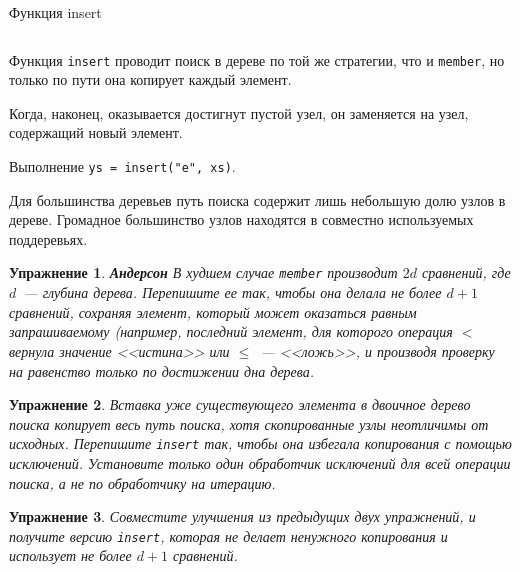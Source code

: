\documentclass[aspectratio=169
  , xcolor={svgnames}
  , hyperref={ colorlinks,citecolor=DeepPink4
             , linkcolor=DarkRed,urlcolor=DarkBlue}
  , russian
  ]{beamer}
\theoremstyle{exerciseStyle1}
\newtheorem{exercise}{\textbf{Упражнение}}[section]
\renewcommand{\cite}[1]{}
\begin{document}
\begin{frame}[fragile]{Функция insert}
\inputminted[firstline=27, lastline=30] {haskell}{code/SearchTree.hs}

Функция \lstinline{insert} проводит поиск в дереве по той же стратегии,
что и \lstinline{member}, но только по пути она копирует каждый
элемент.

Когда, наконец, оказывается достигнут пустой узел, он
заменяется на узел, содержащий новый элемент.
 
\end{frame}

\begin{frame}[fragile]{}
\begin{minipage}{.48\textwidth}
		\par
\end{minipage}
\begin{minipage}{.48\textwidth}
	
\end{minipage}
Выполнение \texttt{ys = insert("e", xs)}. 

Для большинства деревьев путь
поиска содержит лишь небольшую долю узлов в дереве. Громадное
большинство узлов находятся в совместно используемых поддеревьях.
\end{frame}

\begin{frame}
\begin{exercise}\textbf{Андерсон \cite{Andersson1991}}\label{ex:2.2}
  В худшем случае \lstinline{member} производит $2d$ сравнений, где
  $d$~--- глубина дерева. Перепишите ее так, чтобы она делала не более
  $d+1$ сравнений, сохраняя элемент, который \emph{может} оказаться
  равным запрашиваемому (например, последний элемент, для которого
  операция $<$ вернула значение <<истина>> или $\le$~--- <<ложь>>, и
  производя проверку на равенство только по достижении дна дерева.
\end{exercise}

\begin{exercise}\label{ex:2.3}
  Вставка уже существующего элемента в двоичное дерево поиска копирует
  весь путь поиска, хотя скопированные узлы неотличимы от
  исходных. Перепишите \lstinline{insert} так, чтобы она избегала
  копирования с помощью исключений. Установите только один обработчик
  исключений для всей операции поиска, а не по обработчику на итерацию.
\end{exercise}

\begin{exercise}\label{ex:2.4}
  Совместите улучшения из предыдущих двух упражнений, и получите
  версию \lstinline{insert}, которая не делает ненужного копирования и
  использует не более $d+1$ сравнений.
\end{exercise}
\end{frame}
\end{document}
